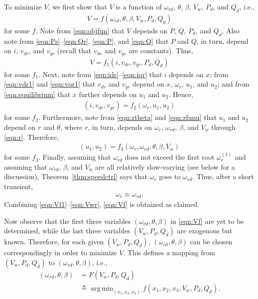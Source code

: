 \documentclass[journal]{IEEEtran}
\begin{document}
To minimize $V$, we first show that $V$ is a function of $\omega_{rd}$, $\theta$, $\beta$, $V_w$, $P_d$, and $Q_d$, i.e.,
\begin{align}
V=f(\omega_{rd}, \theta, \beta, V_w, P_d, Q_d) \label{eqn:Vf}
\end{align}
for some $f$. Note from \eqref{eqn:objfun} that $V$ depends on $P$, $Q$, $P_d$, and $Q_d$. Also note from \eqref{eqn:Ps}--\eqref{eqn:Qr}, \eqref{eqn:P}, and \eqref{eqn:Q} that $P$ and $Q$, in turn, depend on $i$, $v_{dr}$, and $v_{qr}$ (recall that $v_{ds}$ and $v_{qs}$ are constants). Thus,
\begin{align}
V=f_1(i, v_{dr}, v_{qr}, P_d, Q_d) \label{eqn:Vf1}
\end{align}
for some $f_1$. Next, note from \eqref{eqn:ids}--\eqref{eqn:iqr} that $i$ depends on $x$; from \eqref{eqn:vdr1} and \eqref{eqn:vqr1} that $v_{dr}$ and $v_{qr}$ depend on $x$, $\omega_r$, $u_1$, and $u_2$; and from \eqref{eqn:equilibrium} that $x$ further depends on $u_1$ and $u_2$. Hence,
\begin{align}
(i, v_{dr}, v_{qr})=f_2(\omega_r, u_1, u_2) \label{eqn:Vf2}
\end{align}
for some $f_2$. Furthermore, note from \eqref{eqn:ztheta} and \eqref{eqn:zfunu} that $u_1$ and $u_2$ depend on $r$ and $\theta$, where $r$, in turn, depends on $\omega_r$, $\omega_{rd}$, $\beta$, and $V_w$ through \eqref{eqn:r}. Therefore,
\begin{align}
(u_1, u_2)=f_3(\omega_r, \omega_{rd}, \theta, \beta, V_w) \label{eqn:Vf3}
\end{align}
for some $f_3$. Finally, assuming that $\omega_{rd}$ does not exceed the first root $\omega_r^{(1)}$ and assuming that $\omega_{rd}$, $\beta$, and $V_w$ are all relatively slow-varying (see below for a discussion), Theorem~\ref{thm:speedctrl} says that $\omega_r$ goes to $\omega_{rd}$. Thus, after a short transient,
\begin{align}
\omega_r \approx \omega_{rd}. \label{eqn:Vwr}
\end{align}
Combining \eqref{eqn:Vf1}--\eqref{eqn:Vwr}, \eqref{eqn:Vf} is obtained as claimed.

Now observe that the first three variables $(\omega_{rd}, \theta, \beta)$ in \eqref{eqn:Vf} are yet to be determined, while the last three variables $(V_w, P_d, Q_d)$ are exogenous but known. Therefore, for each given $(V_w, P_d, Q_d)$, $(\omega_{rd}, \theta, \beta)$ can be chosen correspondingly in order to minimize $V$. This defines a mapping from $(V_w, P_d, Q_d)$ to $(\omega_{rd}, \theta, \beta)$, i.e.,
\begin{align}
(\omega_{rd}, \theta, \beta)&=F(V_w, P_d, Q_d)\nonumber\\
&\triangleq \operatorname{arg\,min}_{(x_1, x_2, x_3)}f(x_1,\!x_2,\!x_3,\!V_w,\!P_d,\!Q_d). \label{eqn:F}
\end{align}
\end{document}
